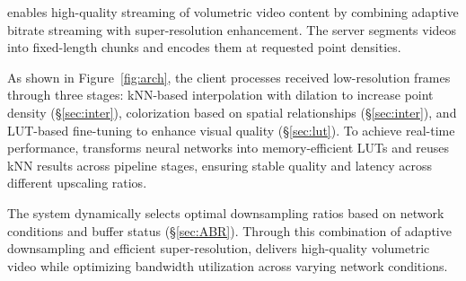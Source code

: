 \name enables high-quality streaming of volumetric video content by combining adaptive bitrate streaming with super-resolution enhancement. The server segments videos into fixed-length chunks and encodes them at requested point densities. 

As shown in Figure~\ref{fig:arch}, the client processes received low-resolution frames through three stages: kNN-based interpolation with dilation to increase point density (\S\ref{sec:inter}), colorization based on spatial relationships (\S\ref{sec:inter}), and LUT-based fine-tuning to enhance visual quality (\S\ref{sec:lut}). To achieve real-time performance, \name transforms neural networks into memory-efficient LUTs and reuses kNN results across pipeline stages, ensuring stable quality and latency across different upscaling ratios.

The system dynamically selects optimal downsampling ratios based on network conditions and buffer status (\S\ref{sec:ABR}). Through this combination of adaptive downsampling and efficient super-resolution, \name delivers high-quality volumetric video while optimizing bandwidth utilization across varying network conditions.